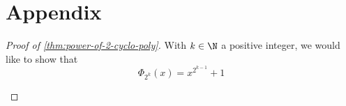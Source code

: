 \chapter*{Appendix}

\begin{proof}[Proof of \autoref{thm:power-of-2-cyclo-poly}]
  With $k \in \N$ a positive integer, we would like to show that
  $$\Phi_{2^k} (x) = x^{2^{k - 1} } + 1$$

  \parencite{power-of-2-cyclo-poly}
\end{proof}
